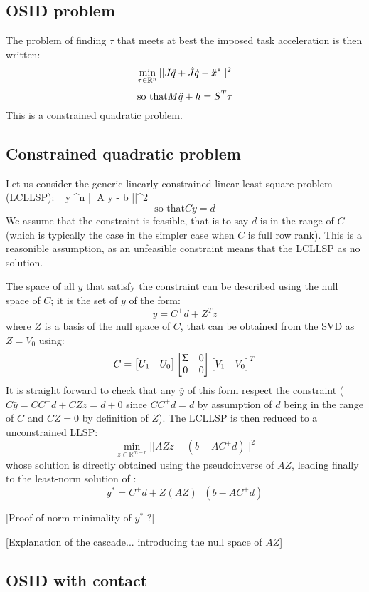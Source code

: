 \documentclass{book}
\begin{document}
\subsection{OSID problem}

The problem of finding $\tau$ that meets at best the imposed task acceleration is then written:
$$ \min_{\tau \in \mathbb{R}^n} || J \ddot q + \dot J \dot q - \ddot x^* ||^2$$
$$ \textrm{so that} M \ddot q + h = S^T \tau$$
This is a constrained quadratic problem.

\subsection{Constrained quadratic problem}

Let us consider the generic linearly-constrained linear least-square problem (LCLLSP):
 \min_{y \in {}^n} || A y - b ||^2 \EOUT
$$ \textrm{so that} C y = d$$
We assume that the constraint is feasible, that is to say $d$ is in the range of $C$ (which is typically the case in the simpler case when $C$ is full row rank). This is a reasonible assumption, as an unfeasible constraint means that the LCLLSP as no solution.

The space of all $y$ that satisfy the constraint can be described using the null space of $C$; it is the set of $\bar y$ of the form:
$$ \bar y = C^+ d + Z^T z$$
where $Z$ is a basis of the null space of $C$, that can be obtained from the SVD as $Z=V_0$ using:
$$ C = \begin{bmatrix} U_1 & U_0 \end{bmatrix} \begin{bmatrix} \Sigma & 0 \\ 0 & 0 \end{bmatrix} \begin{bmatrix} V_1 & V_0 \end{bmatrix}^T$$
It is straight forward to check that any $\bar y$ of this form respect the constraint ($C\bar y= CC^+ d + CZz = d + 0$ since $CC^+d=d$ by assumption of $d$ being in the range of $C$ and $CZ=0$  by definition of $Z$). The LCLLSP is then reduced to a unconstrained LLSP:
$$ \min_{z \in \mathbb{R}^{m-r}} || AZz - (b - AC^+ d) ||^2 $$
whose solution is directly obtained using the pseudoinverse of $AZ$, leading finally to the least-norm solution of :
$$ y^* = C^+d + Z(AZ)^+ ( b - AC^+d)$$

[Proof of norm minimality of $y^*$ ?]

[Explanation of the cascade... introducing the null space of $AZ$]

\subsection{OSID with contact}
\end{document}
